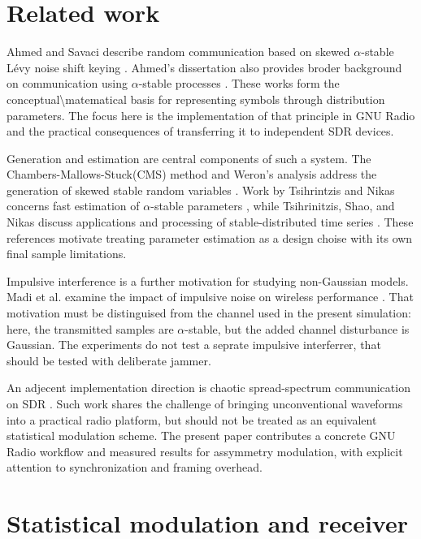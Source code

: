 \documentclass[conference]{IEEEtran}
\begin{document}
\section{Related work}
Ahmed and Savaci describe random communication based on skewed $\alpha$-stable Lévy noise shift keying \cite{b3}. Ahmed's dissertation also provides broder background on communication using $\alpha$-stable processes \cite{2}. These works form the conceptual\textbackslash matematical basis for representing symbols through distribution parameters. The focus here is the implementation of that principle in GNU Radio and the practical consequences of transferring it to independent SDR devices.

Generation and estimation are central components of such a system. The Chambers-Mallows-Stuck(CMS) method and Weron's analysis address the generation of skewed stable random variables \cite{b8}. Work by Tsihrintzis and Nikas concerns fast estimation of $\alpha$-stable parameters \cite{b20}, while Tsihrinitzis, Shao, and Nikas discuss applications and processing of stable-distributed time series \cite{b21}. These references motivate treating parameter estimation as a design choise with its own final sample limitations.

Impulsive interference is a further motivation for studying non-Gaussian models. Madi et al. examine the impact of impulsive noise on wireless performance \cite{b16}. That motivation must be distinguised from the channel used in the present simulation: here, the transmitted samples are $\alpha$-stable, but the added channel disturbance is Gaussian. The experiments do not test a seprate impulsive interferrer, that should be tested with deliberate jammer. 

An adjecent implementation direction is chaotic spread-spectrum communication on SDR \cite{b7}. Such work shares the challenge of bringing unconventional waveforms into a practical radio platform, but should not be treated as an equivalent statistical modulation scheme. The present paper contributes a concrete GNU Radio workflow and measured results for assymmetry modulation, with explicit attention to synchronization and framing overhead.

\section{Statistical modulation and receiver}
\end{document}
